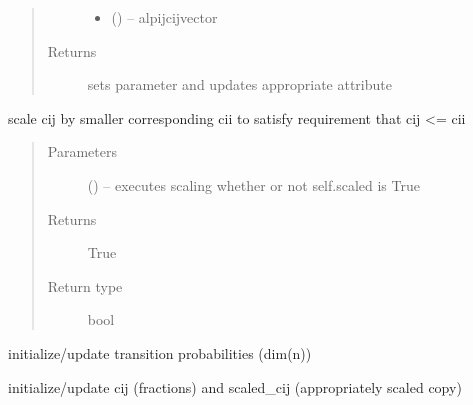 \documentclass[letterpaper,10pt,english]{sphinxmanual}
\begin{document}
\begin{fulllineitems}
\begin{fulllineitems}
\begin{quote}
\begin{description}
\begin{itemize}
\item {} 
 () -- alpij\textbar{}cij\textbar{}vector

\end{itemize}

\item[{Returns}] \leavevmode
sets parameter and updates appropriate attribute

\end{description}\end{quote}

\end{fulllineitems}


\begin{fulllineitems}
\label{\detokenize{rst/transition:mstack.transition.Transition.scale_cij}}
scale cij by smaller corresponding cii to satisfy requirement that
cij \textless{}= cii
\begin{quote}\begin{description}
\item[{Parameters}] \leavevmode
{} () -- executes scaling whether or not self.scaled is True

\item[{Returns}] \leavevmode
True

\item[{Return type}] \leavevmode
bool

\end{description}\end{quote}

\end{fulllineitems}


\begin{fulllineitems}
\label{\detokenize{rst/transition:mstack.transition.Transition.update_alpij}}
initialize/update transition probabilities (dim(n))

\end{fulllineitems}


\begin{fulllineitems}
\label{\detokenize{rst/transition:mstack.transition.Transition.update_cij}}
initialize/update cij (fractions) and scaled\_cij (appropriately scaled copy)


\end{fulllineitems}
\end{fulllineitems}
\end{document}

